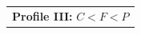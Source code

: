 \documentclass[letter,12pt]{article}
\begin{document}
\begin{figure}
{\begin{tabular}{l}
        \textbf{Profile III:} $C <  F <  P$ \\ 


\end{tabular}}
\end{figure}
\end{document}
